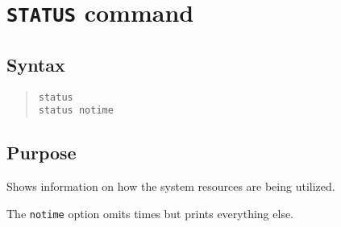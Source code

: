 %
%
%
%
\section{{\tt STATUS} command}
\subsection{Syntax}
\begin{verse}
{\tt status} \\
{\tt status notime}
\end{verse}
\subsection{Purpose}

Shows information on how the system resources are being utilized.

The {\tt notime} option omits times but prints everything else.
